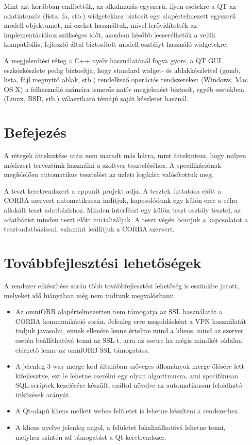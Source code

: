 \documentclass[a4paper,12pt]{article}
\begin{document}
Mint azt korábban említettük, az alkalmazás egyszerű, ilyen esetekre a QT az
adatintenzív (lista, fa, stb.) widgetekhez biztosít egy alapértelmezett egyszerű
modell objektumot, mi ezeket használtuk, mivel lerövidítették az implementációhoz
szükséges időt, azonban később lecserélhetők a velük kompatíbilis, fejlesztő által
biztosított modell osztályt használó widgetekre.

A megjelenítési réteg a C++ nyelv használatánál fogva gyors, a QT GUI eszközkészlete
pedig biztosítja, hogy standard widget- és ablakkészlettel (gomb, lista, fájl megnyitó
ablak, stb.) rendelkező operációs rendszereken (Windows, Mac OS X) a felhasználó
számára ismerős natív megjelenést biztosít, egyéb esetekben (Linux, BSD, stb.)
választható témájú saját készletet használ.

\section{Befejezés}

A rétegek áttekintése után nem maradt más hátra, mint áttekinteni, hogy milyen
módszert terveztünk használni a szoftver teszteléséhez. A specifikációnak
megfelelően automatikus tesztelést az üzleti logikára valósítottuk meg.

A teszt keretrendszert a cppunit projekt adja. A tesztek futtatása előtt a
CORBA szervert automatikusan indítjuk, kapcsolódunk egy külön erre a célra
allokált teszt adatbázishoz. Minden interfészt egy külön teszt osztály tesztel,
az adatbázist minden teszt előtt inicializáljuk. A teszt végén bontjuk a
kapcsolatot a teszt-adatbázissal, valamint leállítjuk a CORBA szervert.

\section{Továbbfejlesztési lehetőségek}

A rendszer elkészítése során több továbbfejlesztési lehetőség is eszünkbe
jutott, melyeket idő hiányában még nem tudtunk megvalósítani:

\begin{itemize}
\item Az omniORB alapértelmezetten nem támogatja az SSL használatát a CORBA
kommunikáció során. Jelenleg erre megoldásként a VPN használatát tudjuk
javasolni, ennek ellenére lenne értelme mind a kliens, mind az szerver esetén
beállíthatóvá tenni az SSL-t, arra az esetre ha mégis mindkét oldalon elérhető
lenne az omniORB SSL támogatása.
\item A jelenleg 3-way merge kód általában szöveges állományok merge-ölésére
lett kifejlesztve, ezt le lehetne cserélni egy olyan algoritmusra, ami
specifikusan SQL scriptek kezelésére készült, ezáltal növelve az automatikusan
feloldható ütközések arányát.
\item A Qt-alapú kliens mellett webes felületet is lehetne készíteni a
rendszerhez.
\item A kliens nyelve jelenleg angol, a felületet lokalizálhatóvá lehetne
tenni, melyhez szintén ad támogatást a Qt keretrendszer.
\end{itemize}
\end{document}

